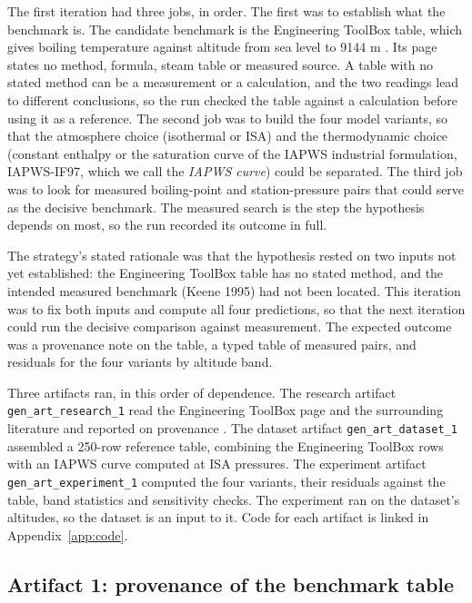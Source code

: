 \documentclass[11pt,letterpaper]{article}
\begin{document}
The first iteration had three jobs, in order. The first was to establish what the benchmark is. The candidate benchmark is the Engineering ToolBox table, which gives boiling temperature against altitude from sea level to 9144 m \cite{ref1}. Its page states no method, formula, steam table or measured source. A table with no stated method can be a measurement or a calculation, and the two readings lead to different conclusions, so the run checked the table against a calculation before using it as a reference. The second job was to build the four model variants, so that the atmosphere choice (isothermal or ISA) and the thermodynamic choice (constant enthalpy or the saturation curve of the IAPWS industrial formulation, IAPWS-IF97, which we call the \emph{IAPWS curve}) could be separated. The third job was to look for measured boiling-point and station-pressure pairs that could serve as the decisive benchmark. The measured search is the step the hypothesis depends on most, so the run recorded its outcome in full.

The strategy's stated rationale was that the hypothesis rested on two inputs not yet established: the Engineering ToolBox table has no stated method, and the intended measured benchmark (Keene 1995) had not been located. This iteration was to fix both inputs and compute all four predictions, so that the next iteration could run the decisive comparison against measurement. The expected outcome was a provenance note on the table, a typed table of measured pairs, and residuals for the four variants by altitude band.

Three artifacts ran, in this order of dependence. The research artifact \texttt{gen\_art\_research\_1} read the Engineering ToolBox page and the surrounding literature and reported on provenance \cite{ref1}. The dataset artifact \texttt{gen\_art\_dataset\_1} assembled a 250-row reference table, combining the Engineering ToolBox rows with an IAPWS curve computed at ISA pressures. The experiment artifact \texttt{gen\_art\_experiment\_1} computed the four variants, their residuals against the table, band statistics and sensitivity checks. The experiment ran on the dataset's altitudes, so the dataset is an input to it. Code for each artifact is linked in Appendix~\ref{app:code}.

\subsection{Artifact 1: provenance of the benchmark table}
\end{document}
